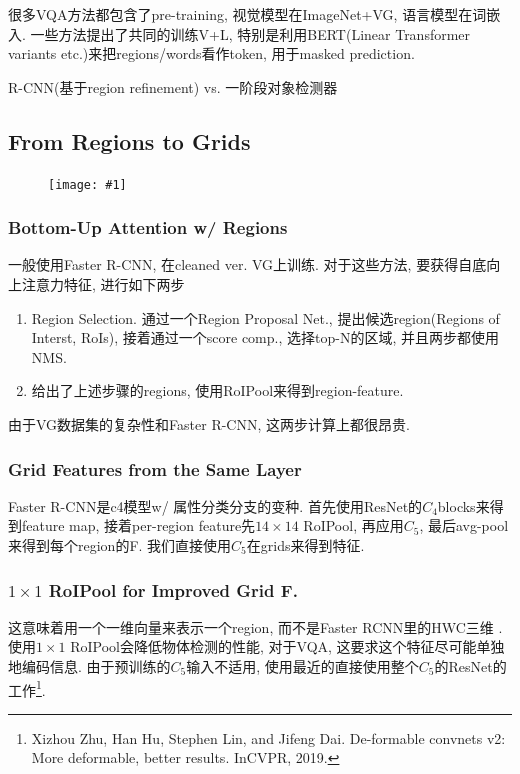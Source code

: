 \documentclass{article}
\newcommand{\cfig}[1]{
    \begin{figure}[htbp]
    \centering
    \texttt{[image: \#1]}
\end{figure}
}
\begin{document}
很多VQA方法都包含了pre-training, 视觉模型在ImageNet+VG, 语言模型在词嵌入. 一些方法提出了共同的训练V+L, 特别是利用BERT(Linear Transformer variants etc.)来把regions/words看作token, 用于masked prediction.

R-CNN(基于region refinement) vs. 一阶段对象检测器

\subsection{From Regions to Grids}

\cfig{gridfeat-comp.png}

\subsubsection{Bottom-Up Attention w/ Regions}

一般使用Faster R-CNN, 在cleaned ver. VG上训练. 对于这些方法, 要获得自底向上注意力特征, 进行如下两步
\begin{enumerate}
    \item Region Selection. 通过一个Region Proposal Net., 提出候选region(Regions of Interst, RoIs), 接着通过一个score comp., 选择top-N的区域, 并且两步都使用NMS.
    \item 给出了上述步骤的regions, 使用RoIPool来得到region-feature.
\end{enumerate}

由于VG数据集的复杂性和Faster R-CNN, 这两步计算上都很昂贵. 

\subsubsection{Grid Features from the Same Layer}

Faster R-CNN是c4模型w/ 属性分类分支的变种. 首先使用ResNet的$C_4$blocks来得到feature map, 接着per-region feature先$14\times 14$ RoIPool, 再应用$C_5$, 最后avg-pool来得到每个region的F. 我们直接使用$C_5$在grids来得到特征.

\subsubsection{$1\times 1$ RoIPool for Improved Grid F.}

这意味着用一个一维向量来表示一个region, 而不是Faster RCNN里的HWC三维 .使用$1\times 1$ RoIPool会降低物体检测的性能, 对于VQA, 这要求这个特征尽可能单独地编码信息. 由于预训练的$C_5$输入不适用, 使用最近的直接使用整个$C_5$的ResNet的工作\footnote{
    Xizhou Zhu, Han Hu, Stephen Lin, and Jifeng Dai.  De-formable convnets v2: More deformable, better results. InCVPR, 2019.
}.
\end{document}
